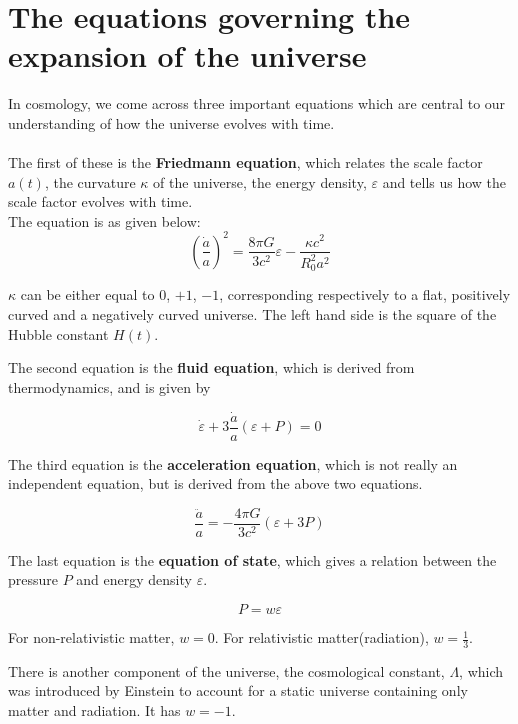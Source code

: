 \documentclass[a4,12pt,oneside]{report}
\begin{document}
	
	\section{The equations governing the expansion of the universe}
	
	In cosmology, we come across three important equations which are central to our understanding of how the universe evolves with time.\\ \\
	The first of these is the \textbf{Friedmann equation}, which relates the scale factor $a(t)$, the curvature $\kappa$ of the universe, the energy density, $\varepsilon$ and tells us how the scale factor evolves with time.\\
	
	The equation is as given below:
	\begin{equation}
	\left(\frac{\dot{a}}{a}\right)^2=\frac{8\pi G}{3c^2}\varepsilon-\frac{\kappa c^2}{R_0^2a^2}
	\end{equation}
	
	$\kappa$ can be either equal to $0$, $+1$, $-1$, corresponding respectively to a flat, positively curved and a negatively curved universe.
	The left hand side is the square of the Hubble constant $H(t)$.
	
	The second equation is the \textbf{fluid equation}, which is derived from thermodynamics, and is given by
	
	\begin{equation}
		\dot{\varepsilon}+3\frac{\dot{a}}{a}(\varepsilon+P)=0
	\end{equation}
	
	The third equation is the \textbf{acceleration equation}, which is not really an independent equation, but is derived from the above two equations.
	
	\begin{equation}
		\frac{\ddot{a}}{a}=-\frac{4\pi G}{3c^2}(\varepsilon+3P)
	\end{equation}
	
	The last equation is the \textbf{equation of state}, which gives a relation between the pressure $P$ and energy density $\varepsilon$.
	
	\begin{equation}
		P=w\varepsilon
	\end{equation}
	
	For non-relativistic matter, $w=0$. For relativistic matter(radiation), $w=\frac{1}{3}$.
	
	There is another component of the universe, the cosmological constant, $\Lambda$, which was introduced by Einstein to account for a static universe containing only matter and radiation. It has $w=-1$.
	
\end{document}
